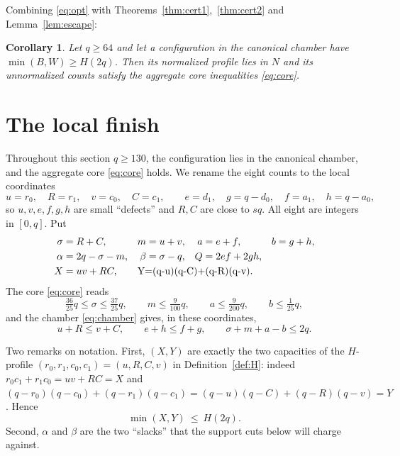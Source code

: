 \documentclass[11pt]{amsart}
\newtheorem{corollary}[theorem]{Corollary}
\theoremstyle{definition}
\theoremstyle{remark}
\begin{document}
Combining \eqref{eq:opt} with Theorems~\ref{thm:cert1},~\ref{thm:cert2} and Lemma~\ref{lem:escape}:

\begin{corollary}\label{cor:escape}
Let $q\ge64$ and let a configuration in the canonical chamber have $\min(B,W)\ge H(2q)$. Then its normalized profile lies in $N$ and its unnormalized counts satisfy the aggregate core inequalities \eqref{eq:core}.
\end{corollary}

\section{The local finish}\label{sec:local}

Throughout this section $q\ge130$, the configuration lies in the canonical chamber, and the aggregate core \eqref{eq:core} holds. We rename the eight counts to the local coordinates
\begin{equation}\label{eq:locvars}
u=r_0,\quad R=r_1,\quad v=c_0,\quad C=c_1,\qquad
e=d_1,\quad g=q-d_0,\quad f=a_1,\quad h=q-a_0,
\end{equation}
so $u,v,e,f,g,h$ are small ``defects'' and $R,C$ are close to $sq$. All eight are integers in $[0,q]$. Put
\begin{equation}\label{eq:aggregates}
\begin{aligned}
\sigma&=R+C, & m&=u+v, & a&=e+f, & b&=g+h,\\
\alpha&=2q-\sigma-m, & \beta&=\sigma-q, & Q&=2ef+2gh,\\
X&=uv+RC, & \multicolumn{4}{l}{Y=(q-u)(q-C)+(q-R)(q-v).}
\end{aligned}
\end{equation}
The core \eqref{eq:core} reads
\begin{equation}\label{eq:core2}
\tfrac{36}{25}q\le\sigma\le\tfrac{37}{25}q,\qquad m\le\tfrac{9}{100}q,\qquad a\le\tfrac{9}{200}q,\qquad b\le\tfrac1{25}q ,
\end{equation}
and the chamber \eqref{eq:chamber} gives, in these coordinates,
\begin{equation}\label{eq:chamber2}
u+R\le v+C,\qquad e+h\le f+g,\qquad \sigma+m+a-b\le2q .
\end{equation}

Two remarks on notation. First, $(X,Y)$ are exactly the two capacities of the $H$-profile $(r_0,r_1,c_0,c_1)=(u,R,C,v)$ in Definition~\ref{def:H}: indeed $r_0c_1+r_1c_0=uv+RC=X$ and $(q-r_0)(q-c_0)+(q-r_1)(q-c_1)=(q-u)(q-C)+(q-R)(q-v)=Y$. Hence
\begin{equation}\label{eq:XYH}
\min(X,Y)\ \le\ H(2q).
\end{equation}
Second, $\alpha$ and $\beta$ are the two ``slacks'' that the support cuts below will charge against.
\end{document}
